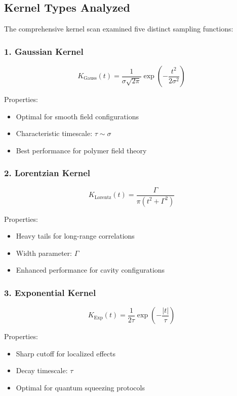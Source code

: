 \subsection{Kernel Types Analyzed}

The comprehensive kernel scan examined five distinct sampling functions:

\subsubsection{1. Gaussian Kernel}
\begin{equation}
K_{\text{Gauss}}(t) = \frac{1}{\sigma\sqrt{2\pi}} \exp\left(-\frac{t^2}{2\sigma^2}\right)
\end{equation}

Properties:
\begin{itemize}
\item Optimal for smooth field configurations
\item Characteristic timescale: $\tau \sim \sigma$
\item Best performance for polymer field theory
\end{itemize}

\subsubsection{2. Lorentzian Kernel}
\begin{equation}
K_{\text{Lorentz}}(t) = \frac{\Gamma}{\pi(t^2 + \Gamma^2)}
\end{equation}

Properties:
\begin{itemize}
\item Heavy tails for long-range correlations
\item Width parameter: $\Gamma$
\item Enhanced performance for cavity configurations
\end{itemize}

\subsubsection{3. Exponential Kernel}
\begin{equation}
K_{\text{Exp}}(t) = \frac{1}{2\tau} \exp\left(-\frac{|t|}{\tau}\right)
\end{equation}

Properties:
\begin{itemize}
\item Sharp cutoff for localized effects
\item Decay timescale: $\tau$
\item Optimal for quantum squeezing protocols
\end{itemize}

